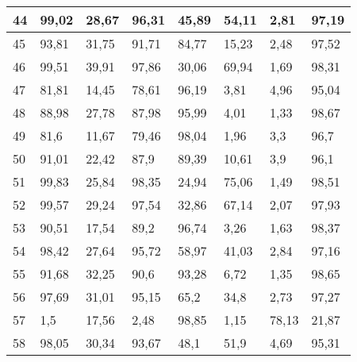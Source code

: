 \begin{longtable}[c]{|l|l|l|l|l|l|l|l|}
44              & 99,02        & 28,67        & 96,31       & 45,89         & 54,11         & 2,81          & 97,19         \\ \hline
45              & 93,81        & 31,75        & 91,71       & 84,77         & 15,23         & 2,48          & 97,52         \\ \hline
46              & 99,51        & 39,91        & 97,86       & 30,06         & 69,94         & 1,69          & 98,31         \\ \hline
47              & 81,81        & 14,45        & 78,61       & 96,19         & 3,81          & 4,96          & 95,04         \\ \hline
48              & 88,98        & 27,78        & 87,98       & 95,99         & 4,01          & 1,33          & 98,67         \\ \hline
49              & 81,6         & 11,67        & 79,46       & 98,04         & 1,96          & 3,3           & 96,7          \\ \hline
50              & 91,01        & 22,42        & 87,9        & 89,39         & 10,61         & 3,9           & 96,1          \\ \hline
51              & 99,83        & 25,84        & 98,35       & 24,94         & 75,06         & 1,49          & 98,51         \\ \hline
52              & 99,57        & 29,24        & 97,54       & 32,86         & 67,14         & 2,07          & 97,93         \\ \hline
53              & 90,51        & 17,54        & 89,2        & 96,74         & 3,26          & 1,63          & 98,37         \\ \hline
54              & 98,42        & 27,64        & 95,72       & 58,97         & 41,03         & 2,84          & 97,16         \\ \hline
55              & 91,68        & 32,25        & 90,6        & 93,28         & 6,72          & 1,35          & 98,65         \\ \hline
56              & 97,69        & 31,01        & 95,15       & 65,2          & 34,8          & 2,73          & 97,27         \\ \hline
57              & 1,5          & 17,56        & 2,48        & 98,85         & 1,15          & 78,13         & 21,87         \\ \hline
58              & 98,05        & 30,34        & 93,67       & 48,1          & 51,9          & 4,69          & 95,31         \\ \hline

\end{longtable}
